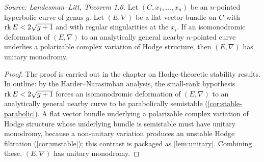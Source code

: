 \begin{theorem}
  \label{thm:isomonodromic-deformation-CVHS}
  \textit{Source: Landesman--Litt, Theorem 1.6.}
  Let $(C, x_1, \ldots, x_n)$ be an $n$-pointed hyperbolic curve of genus $g$.
  Let $(E, \nabla)$ be a flat vector bundle on $C$ with $\operatorname{rk} E < 2\sqrt{g+1}$ and
  with regular singularities at the $x_i$. If an isomonodromic deformation of
  $(E, \nabla)$ to an analytically general nearby $n$-pointed curve underlies a
  polarizable complex variation of Hodge structure, then $(E, \nabla)$ has
  unitary monodromy.
\end{theorem}

\begin{proof}
  The proof is carried out in the chapter on Hodge-theoretic stability results.
  In outline: by the Harder--Narasimhan analysis, the small-rank hypothesis
  $\operatorname{rk} E < 2\sqrt{g+1}$ forces an isomonodromic deformation of $(E, \nabla)$ to an
  analytically general nearby curve to be parabolically semistable
  (\cref{cor:stable-parabolic}). A flat vector bundle underlying a polarizable
  complex variation of Hodge structure whose underlying bundle is semistable must
  have unitary monodromy, because a non-unitary variation produces an unstable
  Hodge filtration (\cref{cor:unstable}); this contrast is packaged as
  \cref{lem:unitary}. Combining these, $(E, \nabla)$ has unitary monodromy.
\end{proof}

